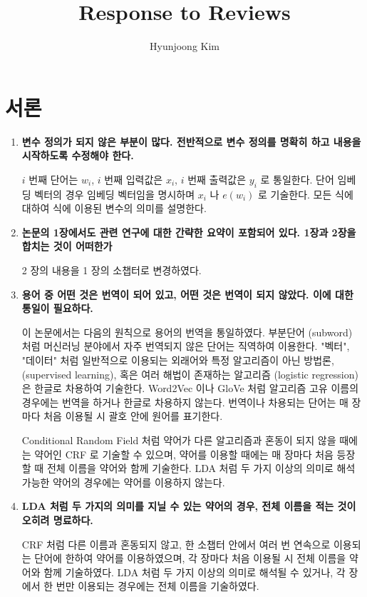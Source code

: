 \documentclass[11pt]{article}
\begin{document}
\title{Response to Reviews}
\author{Hyunjoong Kim}
\maketitle
\smallskip

\section{서론}
\begin{enumerate}
\item \textbf{변수 정의가 되지 않은 부분이 많다. 전반적으로 변수 정의를 명확히 하고 내용을 시작하도록 수정해야 한다.}

$i$ 번째 단어는 $w_i$, $i$ 번째 입력값은 $x_i$, $i$ 번째 출력값은 $y_i$ 로 통일한다. 단어 임베딩 벡터의 경우 임베딩 벡터임을 명시하며 $x_i$ 나 $e(w_i)$ 로 기술한다. 모든 식에 대하여 식에 이용된 변수의 의미를 설명한다.

\item \textbf{논문의 1장에서도 관련 연구에 대한 간략한 요약이 포함되어 있다. 1장과 2장을 합치는 것이 어떠한가}

2 장의 내용을 1 장의 소챕터로 변경하였다.


\item \textbf{용어 중 어떤 것은 번역이 되어 있고, 어떤 것은 번역이 되지 않았다. 이에 대한 통일이 필요하다.}

이 논문에서는 다음의 원칙으로 용어의 번역을 통일하였다. 부분단어 (subword) 처럼 머신러닝 분야에서 자주 번역되지 않은 단어는 직역하여 이용한다. "벡터", "데이터" 처럼 일반적으로 이용되는 외래어와 특정 알고리즘이 아닌 방법론, (supervised learning), 혹은 여러 해법이 존재하는 알고리즘 (logistic regression) 은 한글로 차용하여 기술한다. Word2Vec 이나 GloVe 처럼 알고리즘 고유 이름의 경우에는 번역을 하거나 한글로 차용하지 않는다. 번역이나 차용되는 단어는 매 장마다 처음 이용될 시 괄호 안에 원어를 표기한다. 

Conditional Random Field 처럼 약어가 다른 알고리즘과 혼동이 되지 않을 때에는 약어인 CRF 로 기술할 수 있으며, 약어를 이용할 때에는 매 장마다 처음 등장할 때 전체 이름을 약어와 함께 기술한다. LDA 처럼 두 가지 이상의 의미로 해석 가능한 약어의 경우에는 약어를 이용하지 않는다.

\item \textbf{LDA 처럼 두 가지의 의미를 지닐 수 있는 약어의 경우, 전체 이름을 적는 것이 오히려 명료하다.}

CRF 처럼 다른 이름과 혼동되지 않고, 한 소챕터 안에서 여러 번 연속으로 이용되는 단어에 한하여 약어를 이용하였으며, 각 장마다 처음 이용될 시 전체 이름을 약어와 함께 기술하였다. LDA 처럼 두 가지 이상의 의미로 해석될 수 있거나, 각 장에서 한 번만 이용되는 경우에는 전체 이름을 기술하였다.


\end{enumerate}
\end{document}
